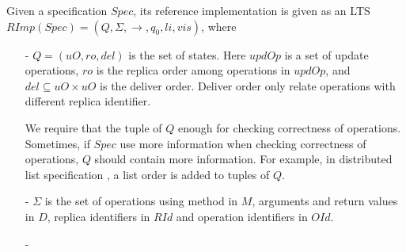 
Given a specification $Spec$, its reference implementation is given as an LTS $RImp(Spec) = (Q,\Sigma,\rightarrow,q_0,li,vis)$, where 

\begin{itemize}
\setlength{\itemsep}{0.5pt}
\item[-] $Q = (uO,ro,del)$ is the set of states. Here $updOp$ is a set of update operations, $ro$ is the replica order among operations in $updOp$, and $del \subseteq uO \times uO$ is the deliver order. Deliver order only relate operations with different replica identifier. 
    
    We require that the tuple of $Q$ enough for checking correctness of operations. Sometimes, if $Spec$ use more information when checking correctness of operations, $Q$ should contain more information. For example, in distributed list specification \cite{Attiya:2016}, a list order is added to tuples of $Q$. 
    
\item[-] $\Sigma$ is the set of operations using method in $M$, arguments and return values in $D$, replica identifiers in $RId$ and operation identifiers in $OId$. 

\item[-] 
\end{itemize}








